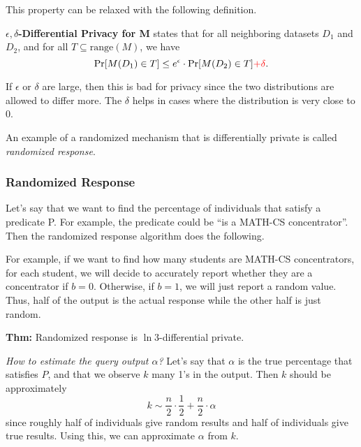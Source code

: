 This property can be relaxed with the following definition.

\begin{definition}
    \textbf{$\epsilon, \delta$-Differential Privacy for M} states that for all neighboring datasets $D_1$ and $D_2$, and for all $T \subseteq \text{range}(M)$, we have
    $$\Pr [M(D_1) \in T] \leq e^{\epsilon} \cdot \Pr[M(D_2) \in T] {\color{red} + \delta}.$$

    If $\epsilon$ or $\delta$ are large, then this is bad for privacy since the two distributions are allowed to differ more. The $\delta$ helps in cases where the distribution is very close to 0.
\end{definition}

An example of a randomized mechanism that is differentially private is called \textit{randomized response}.

\subsubsection{Randomized Response}

Let's say that we want to find the percentage of individuals that satisfy a predicate P. For example, the predicate could be ``is a MATH-CS concentrator''. Then the randomized response algorithm does the following.


For example, if we want to find how many students are MATH-CS concentrators, for each student, we will decide to accurately report whether they are a concentrator if $b=0$. Otherwise, if $b=1$, we will just report a random value. Thus, half of the output is the actual response while the other half is just random.

\textbf{Thm:} Randomized response is $\ln 3$-differential private.

\textit{How to estimate the query output $\alpha$?} Let's say that $\alpha$ is the true percentage that satisfies $P$, and that we observe $k$ many 1's in the output. Then $k$ should be approximately
$$k \sim \frac{n}{2}\cdot\frac{1}{2} + \frac{n}{2}\cdot \alpha$$
since roughly half of individuals give random results and half of individuals give true results. Using this, we can approximate $\alpha$ from $k$.

